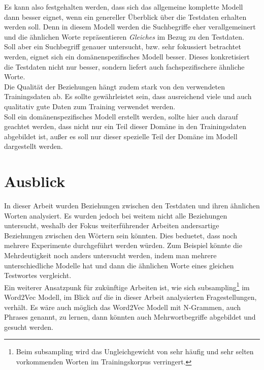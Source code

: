 \documentclass[12pt,a4paper]{report}
\begin{document}
Es kann also festgehalten werden, dass sich das allgemeine komplette Modell dann besser eignet, wenn ein genereller Überblick über die Testdaten erhalten werden soll. Denn in diesem Modell werden die Suchbegriffe eher verallgemeinert und die ähnlichen Worte repräsentieren \textit{Gleiches} im Bezug zu den Testdaten.\\
Soll aber ein Suchbegriff genauer untersucht, bzw. sehr fokussiert betrachtet werden, eignet sich ein domänenspezifisches Modell besser. Dieses konkretisiert die Testdaten nicht nur besser, sondern liefert auch fachspezifischere ähnliche Worte.\\

Die Qualität der Beziehungen hängt zudem stark von den verwendeten Trainingsdaten ab. Es sollte gewährleistet sein, dass ausreichend viele und auch qualitativ gute Daten zum Training verwendet werden.\\
Soll ein domänenspezifisches Modell erstellt werden, sollte hier auch darauf geachtet werden, dass nicht nur ein Teil dieser Domäne in den Trainingsdaten abgebildet ist, außer es soll nur dieser spezielle Teil der Domäne im Modell dargestellt werden.\\


\section{Ausblick}

In dieser Arbeit wurden Beziehungen zwischen den Testdaten und ihren ähnlichen Worten analysiert. Es wurden jedoch bei weitem nicht alle Beziehungen untersucht, weshalb der Fokus weiterführender Arbeiten andersartige Beziehungen zwischen den Wörtern sein könnten. Dies beduetet, dass noch mehrere Experimente durchgeführt werden würden. Zum Beispiel könnte die Mehrdeutigkeit noch anders untersucht werden, indem man mehrere unterschiedliche Modelle hat und dann die ähnlichen Worte eines gleichen Testwortes vergleicht.\\

Ein weiterer Ansatzpunk  für zukünftige Arbeiten ist, wie sich subsampling\footnote{Beim subsampling wird das Ungleichgewicht von sehr häufig und sehr selten vorkommenden Worten im Trainingskorpus verringert\citep{DBLP:journals/corr/MikolovSCCD13}. } im Word2Vec Modell, im Blick auf die in dieser Arbeit analysierten Fragestellungen, verhält. Es wäre auch möglich das Word2Vec Modell mit N-Grammen, auch Phrases genannt, zu lernen, dann könnten auch Mehrwortbegriffe abgebildet und gesucht werden.
\end{document}
